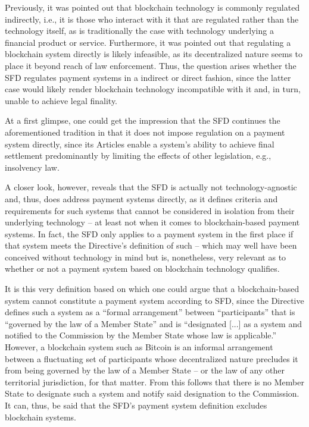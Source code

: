 Previously, it was pointed out that blockchain technology is commonly regulated indirectly, i.e., it is those who interact with it that are regulated rather than the technology itself, as is traditionally the case with technology underlying a financial product or service.
Furthermore, it was pointed out that regulating a blockchain system directly is likely infeasible, as its decentralized nature seems to place it beyond reach of law enforcement.
Thus, the question arises whether the SFD regulates payment systems in a indirect or direct fashion, since the latter case would likely render blockchain technology incompatible with it and, in turn, unable to achieve legal finality.

At a first glimpse, one could get the impression that the SFD continues the aforementioned tradition in that it does not impose regulation on a payment system directly, since its Articles enable a system's ability to achieve final settlement predominantly by limiting the effects of other legislation, e.g., insolvency law.

A closer look, however, reveals that the SFD is actually not technology-agnostic and, thus, does address payment systems directly, as it defines criteria and requirements for such systems that cannot be considered in isolation from their underlying technology -- at least not when it comes to blockchain-based payment systems.
In fact, the SFD only applies to a payment system in the first place if that system meets the Directive's definition of such \autocite[Article 2(a)]{eu1998} -- which may well have been conceived without technology in mind but is, nonetheless, very relevant as to whether or not a payment system based on blockchain technology qualifies.

It is this very definition based on which one could argue that a blockchain-based system cannot constitute a payment system according to SFD, since the Directive defines such a system as a ``formal arrangement'' between ``participants'' that is ``governed by the law of a Member State'' and is ``designated [...] as a system and notified to the Commission by the Member State whose law is applicable.'' \autocite{eu1998}
However, a blockchain system such as Bitcoin is an informal arrangement between a fluctuating set of participants whose decentralized nature precludes it from being governed by the law of a Member State -- or the law of any other territorial jurisdiction, for that matter.
From this follows that there is no Member State to designate such a system and notify said designation to the Commission.
It can, thus, be said that the SFD's payment system definition excludes blockchain systems.

